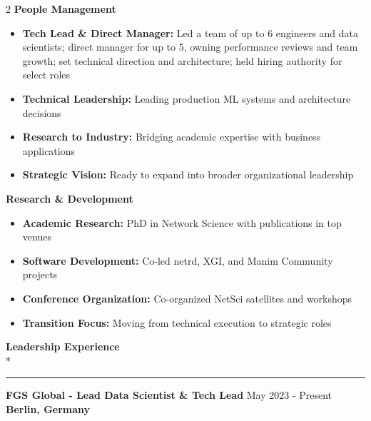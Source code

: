 \documentclass[11pt,a4paper]{article}
\newlength{\spacesm}    \setlength{\spacesm}{11pt}     %
\newlength{\spacexl}    \setlength{\spacexl}{38pt}     %
\newcommand{\bodytext}[1]{%
    {\fontsize{10pt}{14pt}\selectfont\color{charcoal} #1}%
}
\newcommand{\bodytextbold}[1]{%
    {\fontsize{10pt}{14pt}\selectfont\color{charcoal}\bfseries #1}%
}
\newcommand{\microtext}[1]{%
    {\fontsize{8pt}{11pt}\selectfont\color{mediumgray} #1}%
}
\newcommand{\sectiontitle}[1]{%
    \needspace{4\baselineskip}%
    \vspace{\spacexl}%
    {\fontsize{12pt}{14pt}\selectfont\color{navy}\bfseries #1}\\*%
    \vspace{1pt}%
    {\color{gold}\rule{20pt}{1pt}}%
    \vspace{0pt}%
}
\newcommand{\goldbullet}{{\color{gold}$\bullet$}\space}
\newcommand{\jobduration}[1]{%
    {\fontspec{JetBrains Mono}\microtext{#1}}
}
\newcommand{\companyname}[1]{%
    {\color{darkgray}\bfseries #1}
}
\begin{document}
\setlength{\multicolsep}{0pt}
\begin{multicols}{2}
\raggedcolumns
\bodytextbold{People Management}
\vspace{2pt}
\begin{itemize}[leftmargin=15pt,itemindent=0pt,labelwidth=10pt,labelsep=5pt,itemsep=1pt,parsep=0pt,topsep=0pt,partopsep=0pt]
    \item[\goldbullet] \bodytext{\textbf{Tech Lead \& Direct Manager:} Led a team of up to 6 engineers and data scientists; direct manager for up to 5, owning performance reviews and team growth; set technical direction and architecture; held hiring authority for select roles}
    \item[\goldbullet] \bodytext{\textbf{Technical Leadership:} Leading production ML systems and architecture decisions}
    \item[\goldbullet] \bodytext{\textbf{Research to Industry:} Bridging academic expertise with business applications}
    \item[\goldbullet] \bodytext{\textbf{Strategic Vision:} Ready to expand into broader organizational leadership}
\end{itemize}

\columnbreak

\bodytextbold{Research \& Development}
\vspace{2pt}
\begin{itemize}[leftmargin=15pt,itemindent=0pt,labelwidth=10pt,labelsep=5pt,itemsep=1pt,parsep=0pt,topsep=0pt,partopsep=0pt]
    \item[\goldbullet] \bodytext{\textbf{Academic Research:} PhD in Network Science with publications in top venues}
    \item[\goldbullet] \bodytext{\textbf{Software Development:} Co-led netrd, XGI, and Manim Community projects}
    \item[\goldbullet] \bodytext{\textbf{Conference Organization:} Co-organized NetSci satellites and workshops}
    \item[\goldbullet] \bodytext{\textbf{Transition Focus:} Moving from technical execution to strategic roles}
\end{itemize}
\end{multicols}

\sectiontitle{Leadership Experience}
\vspace{\spacesm}

\bodytext{\textbf{FGS Global - Lead Data Scientist \& Tech Lead}} \hfill \jobduration{May 2023 - Present}\\
\companyname{Berlin, Germany}
\end{document}
